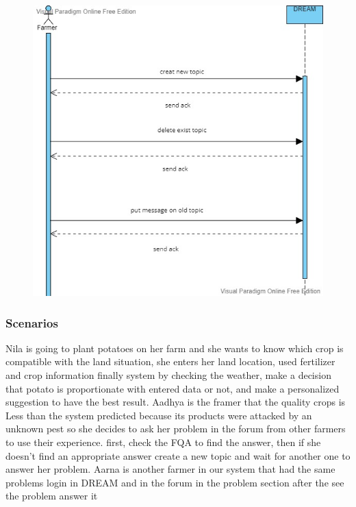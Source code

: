 \begin{figure}[H]
\includegraphics[width=1\textwidth]{figures/fifthSequenceDiagram.jpg}
\end{figure}
    \subsubsection{Scenarios}
    
    Nila is going to plant potatoes on her farm and she wants to know which crop is compatible with the land situation, she enters her land location, used fertilizer and crop information finally system by checking the weather, make a decision that  potato is proportionate with entered data or not, and make a personalized suggestion to have the best result.
\newline
\newline
Aadhya is the framer that the quality crops is Less than the system predicted because its products were attacked by an unknown pest so she decides to ask her problem in the forum from other farmers to use their experience. first, check the FQA to find the answer, then if she doesn't find an appropriate answer create a new topic and wait for another one to answer her problem. Aarna is another farmer in our system that had the same problems login in DREAM and in the forum in the problem section after the see the problem answer it 
\newline
\newline



